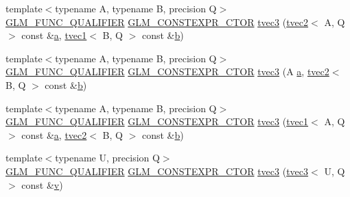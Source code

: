\begin{DoxyCompactItemize}
\item 
{\footnotesize template$<$typename A, typename B, precision Q$>$ }\\\mbox{\hyperlink{setup_8hpp_a33fdea6f91c5f834105f7415e2a64407}{G\+L\+M\+\_\+\+F\+U\+N\+C\+\_\+\+Q\+U\+A\+L\+I\+F\+I\+ER}} \mbox{\hyperlink{setup_8hpp_ad34178a09666081abdb573c14d1f4a5a}{G\+L\+M\+\_\+\+C\+O\+N\+S\+T\+E\+X\+P\+R\+\_\+\+C\+T\+OR}} \mbox{\hyperlink{structglm_1_1tvec3_a8076ac0b4ff4fcc44a88d9ff282c65fd}{tvec3}} (\mbox{\hyperlink{structglm_1_1tvec2}{tvec2}}$<$ A, Q $>$ const \&\mbox{\hyperlink{glad_8h_ac8729153468b5dcf13f971b21d84d4e5}{a}}, \mbox{\hyperlink{structglm_1_1tvec1}{tvec1}}$<$ B, Q $>$ const \&\mbox{\hyperlink{glad_8h_a6eba317e3cf44d6d26c04a5a8f197dcb}{b}})
\item 
{\footnotesize template$<$typename A, typename B, precision Q$>$ }\\\mbox{\hyperlink{setup_8hpp_a33fdea6f91c5f834105f7415e2a64407}{G\+L\+M\+\_\+\+F\+U\+N\+C\+\_\+\+Q\+U\+A\+L\+I\+F\+I\+ER}} \mbox{\hyperlink{setup_8hpp_ad34178a09666081abdb573c14d1f4a5a}{G\+L\+M\+\_\+\+C\+O\+N\+S\+T\+E\+X\+P\+R\+\_\+\+C\+T\+OR}} \mbox{\hyperlink{structglm_1_1tvec3_af057ada5ce68dbd5954d9c4cde8898b3}{tvec3}} (A \mbox{\hyperlink{glad_8h_ac8729153468b5dcf13f971b21d84d4e5}{a}}, \mbox{\hyperlink{structglm_1_1tvec2}{tvec2}}$<$ B, Q $>$ const \&\mbox{\hyperlink{glad_8h_a6eba317e3cf44d6d26c04a5a8f197dcb}{b}})
\item 
{\footnotesize template$<$typename A, typename B, precision Q$>$ }\\\mbox{\hyperlink{setup_8hpp_a33fdea6f91c5f834105f7415e2a64407}{G\+L\+M\+\_\+\+F\+U\+N\+C\+\_\+\+Q\+U\+A\+L\+I\+F\+I\+ER}} \mbox{\hyperlink{setup_8hpp_ad34178a09666081abdb573c14d1f4a5a}{G\+L\+M\+\_\+\+C\+O\+N\+S\+T\+E\+X\+P\+R\+\_\+\+C\+T\+OR}} \mbox{\hyperlink{structglm_1_1tvec3_a64c26f79c83220322f8bdcab744dc033}{tvec3}} (\mbox{\hyperlink{structglm_1_1tvec1}{tvec1}}$<$ A, Q $>$ const \&\mbox{\hyperlink{glad_8h_ac8729153468b5dcf13f971b21d84d4e5}{a}}, \mbox{\hyperlink{structglm_1_1tvec2}{tvec2}}$<$ B, Q $>$ const \&\mbox{\hyperlink{glad_8h_a6eba317e3cf44d6d26c04a5a8f197dcb}{b}})
\item 
{\footnotesize template$<$typename U, precision Q$>$ }\\\mbox{\hyperlink{setup_8hpp_a33fdea6f91c5f834105f7415e2a64407}{G\+L\+M\+\_\+\+F\+U\+N\+C\+\_\+\+Q\+U\+A\+L\+I\+F\+I\+ER}} \mbox{\hyperlink{setup_8hpp_ad34178a09666081abdb573c14d1f4a5a}{G\+L\+M\+\_\+\+C\+O\+N\+S\+T\+E\+X\+P\+R\+\_\+\+C\+T\+OR}} \mbox{\hyperlink{structglm_1_1tvec3_a1366e758df5526833c39e492b07a026c}{tvec3}} (\mbox{\hyperlink{structglm_1_1tvec3}{tvec3}}$<$ U, Q $>$ const \&\mbox{\hyperlink{glad_8h_a14cfbe2fc2234f5504618905b69d1e06}{v}})

\end{DoxyCompactItemize}
